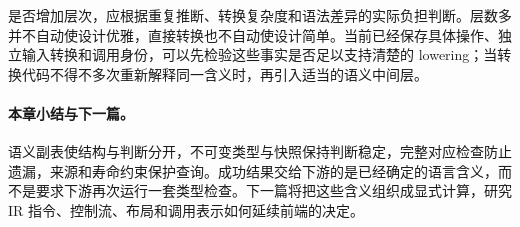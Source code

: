 是否增加层次，应根据重复推断、转换复杂度和语法差异的实际负担判断。层数多并不自动使设计优雅，直接转换也不自动使设计简单。当前已经保存具体操作、独立输入转换和调用身份，可以先检验这些事实是否足以支持清楚的 lowering；当转换代码不得不多次重新解释同一含义时，再引入适当的语义中间层。

\paragraph{本章小结与下一篇。}
语义副表使结构与判断分开，不可变类型与快照保持判断稳定，完整对应检查防止遗漏，来源和寿命约束保护查询。成功结果交给下游的是已经确定的语言含义，而不是要求下游再次运行一套类型检查。下一篇将把这些含义组织成显式计算，研究 IR 指令、控制流、布局和调用表示如何延续前端的决定。
